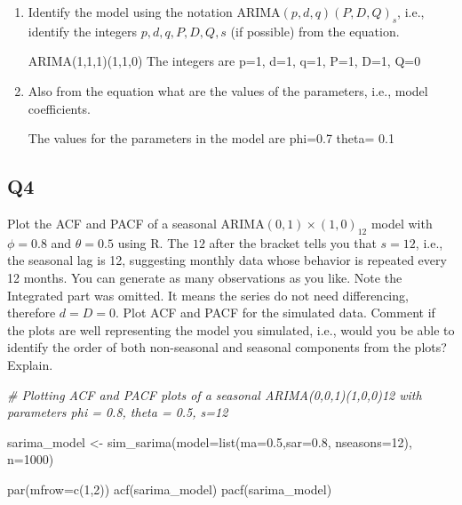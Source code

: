 \documentclass[
]{article}
\newenvironment{Shaded}{\begin{snugshade}}{\end{snugshade}}
\newcommand{\AttributeTok}[1]{\textcolor[rgb]{0.77,0.63,0.00}{#1}}
\newcommand{\CommentTok}[1]{\textcolor[rgb]{0.56,0.35,0.01}{\textit{#1}}}
\newcommand{\DecValTok}[1]{\textcolor[rgb]{0.00,0.00,0.81}{#1}}
\newcommand{\FloatTok}[1]{\textcolor[rgb]{0.00,0.00,0.81}{#1}}
\newcommand{\FunctionTok}[1]{\textcolor[rgb]{0.00,0.00,0.00}{#1}}
\newcommand{\NormalTok}[1]{#1}
\newcommand{\OtherTok}[1]{\textcolor[rgb]{0.56,0.35,0.01}{#1}}
\begin{document}
\begin{enumerate}[label=(\alph*)]

\item Identify the model using the notation ARIMA$(p,d,q)(P,D,Q)_ s$, i.e., identify the integers $p,d,q,P,D,Q,s$ (if possible) from the equation.

ARIMA(1,1,1)(1,1,0)
The integers are p=1, d=1, q=1, P=1, D=1, Q=0

\item Also from the equation what are the values of the parameters, i.e., model coefficients. 

The values for the parameters in the model are phi=0.7 theta= 0.1

\end{enumerate}

\hypertarget{q4}{%
\subsection{Q4}\label{q4}}

Plot the ACF and PACF of a seasonal ARIMA\((0, 1)\times(1, 0)_{12}\)
model with \(\phi =0 .8\) and \(\theta = 0.5\) using R. The \(12\) after
the bracket tells you that \(s=12\), i.e., the seasonal lag is 12,
suggesting monthly data whose behavior is repeated every 12 months. You
can generate as many observations as you like. Note the Integrated part
was omitted. It means the series do not need differencing, therefore
\(d=D=0\). Plot ACF and PACF for the simulated data. Comment if the
plots are well representing the model you simulated, i.e., would you be
able to identify the order of both non-seasonal and seasonal components
from the plots? Explain.

\begin{Shaded}
\begin{Highlighting}[]
\CommentTok{\# Plotting ACF and PACF plots of a seasonal ARIMA(0,0,1)(1,0,0)12 with parameters phi = 0.8, theta = 0.5, s=12}

\NormalTok{sarima\_model }\OtherTok{\textless{}{-}} \FunctionTok{sim\_sarima}\NormalTok{(}\AttributeTok{model=}\FunctionTok{list}\NormalTok{(}\AttributeTok{ma=}\FloatTok{0.5}\NormalTok{,}\AttributeTok{sar=}\FloatTok{0.8}\NormalTok{, }\AttributeTok{nseasons=}\DecValTok{12}\NormalTok{), }\AttributeTok{n=}\DecValTok{1000}\NormalTok{) }

\FunctionTok{par}\NormalTok{(}\AttributeTok{mfrow=}\FunctionTok{c}\NormalTok{(}\DecValTok{1}\NormalTok{,}\DecValTok{2}\NormalTok{))}
\FunctionTok{acf}\NormalTok{(sarima\_model)}
\FunctionTok{pacf}\NormalTok{(sarima\_model)}
\end{Highlighting}
\end{Shaded}
\end{document}
